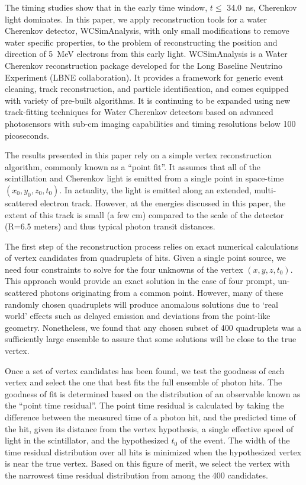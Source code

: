 \documentclass[aps,prc,twocolumn,groupedaddress,showpacs,amsmath,amssymb,floatfix,superscriptaddress]{revtex4}
\begin{document}
The timing studies show that in the early time window, $t\leq$
34.0~ns, Cherenkov light dominates. In this paper, we apply
reconstruction tools for a water Cherenkov detector, WCSimAnalysis,
with only small modifications to remove water specific properties, to
the problem of reconstructing the position and direction of 5~MeV
electrons from this early light.  WCSimAnalysis is a Water Cherenkov
reconstruction package developed for the Long Baseline Neutrino
Experiment (LBNE collaboration)\cite{Blake}. It provides a framework
for generic event cleaning, track reconstruction, and particle
identification, and comes equipped with variety of pre-built
algorithms. It is continuing to be expanded using new track-fitting
techniques for Water Cherenkov detectors\cite{Sanchez2012525} based on
advanced photosensors with sub-cm imaging capabilities and timing
resolutions below 100 picoseconds\cite{LAPPDSum,LAPPDTDR}.

The results presented in this paper rely on a simple vertex
reconstruction algorithm, commonly known as a ``point
fit''\cite{SuperKalgo}. It assumes that all of the scintillation and
Cherenkov light is emitted from a single point in space-time
$(x_0,y_0,z_0,t_0)$. In actuality, the light is emitted along an
extended, multi-scattered electron track. However, at the energies
discussed in this paper, the extent of this track is small (a few cm)
compared to the scale of the detector (R=6.5 meters) and thus typical
photon transit distances.

The first step of the reconstruction process relies on exact numerical
calculations of vertex candidates from quadruplets of hits. Given a
single point source, we need four constraints to solve for the four
unknowns of the vertex $(x,y,z,t_0)$\cite{Smy}. This approach
would provide an exact solution in the case of four prompt,
un-scattered photons originating from a common point. However, many of
these randomly chosen quadruplets will produce anomalous solutions due
to `real world' effects such as delayed emission and deviations from the
point-like geometry. Nonetheless, we found that any chosen subset of
400 quadruplets was a sufficiently large ensemble to assure that some
solutions will be close to the true vertex.

Once a set of vertex candidates has been found, we test the goodness
of each vertex and select the one that best fits the full ensemble of
photon hits. The goodness of fit is determined based on the
distribution of an observable known as the ``point time
residual''\cite{SuperKalgo}. The point time residual is calculated by
taking the difference between the measured time of a photon hit, and
the predicted time of the hit, given its distance from the vertex
hypothesis, a single effective speed of light in the scintillator, and
the hypothesized $t_0$ of the event. The width of the time residual
distribution over all hits is minimized when the hypothesized vertex
is near the true vertex. Based on this figure of merit, we select the
vertex with the narrowest time residual distribution from among the
400 candidates.
\end{document}
